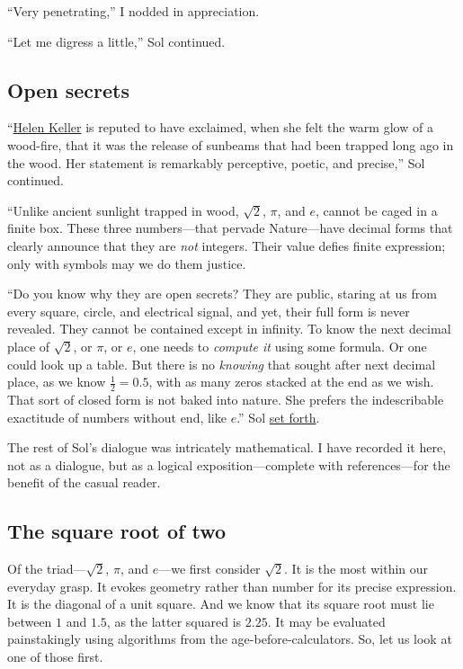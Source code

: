 \documentclass[
  a4paper,
]{article}
\begin{document}
``Very penetrating,'' I nodded in appreciation.

``Let me digress a little,'' Sol continued.

\subsection{Open secrets}\label{open-secrets}

``\href{https://en.wikipedia.org/wiki/Helen_Keller}{Helen Keller} is
reputed to have exclaimed, when she felt the warm glow of a wood-fire,
that it was the release of sunbeams that had been trapped long ago in
the wood. Her statement is remarkably perceptive, poetic, and precise,''
Sol continued.

``Unlike ancient sunlight trapped in wood, \(\sqrt{2}\), \(\pi\), and
\(e\), cannot be caged in a finite box. These three numbers---that
pervade Nature---have decimal forms that clearly announce that they are
\emph{not} integers. Their value defies finite expression; only with
symbols may we do them justice.

``Do you know why they are open secrets? They are public, staring at us
from every square, circle, and electrical signal, and yet, their full
form is never revealed. They cannot be contained except in infinity. To
know the next decimal place of \(\sqrt{2}\), or \(\pi\), or \(e\), one
needs to \emph{compute it} using some formula. Or one could look up a
table. But there is no \emph{knowing} that sought after next decimal
place, as we know \(\frac{1}{2} = 0.5\), with as many zeros stacked at
the end as we wish. That sort of closed form is not baked into nature.
She prefers the indescribable exactitude of numbers without end, like
\(e\).'' Sol \href{https://www.thefreedictionary.com/set+forth}{set
forth}.

The rest of Sol's dialogue was intricately mathematical. I have recorded
it here, not as a dialogue, but as a logical exposition---complete with
references---for the benefit of the casual reader.

\subsection{The square root of two}\label{the-square-root-of-two}

Of the triad---\(\sqrt{2}\), \(\pi\), and \(e\)---we first consider
\(\sqrt{2}\). It is the most within our everyday grasp. It evokes
geometry rather than number for its precise expression. It is the
diagonal of a unit square. And we know that its square root must lie
between \(1\) and \(1.5\), as the latter squared is \(2.25\). It may be
evaluated painstakingly using algorithms from the
age-before-calculators. So, let us look at one of those first.
\end{document}
